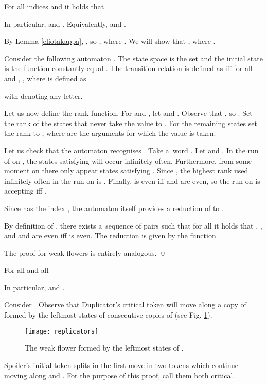 \documentclass{LMCS}
\begin{document}
\begin{lem} \label{flowers}
For all indices  and  it holds that 

In particular,  and . Equivalently,   and  .
\end{lem}

\proof By Lemma \ref{eliotakappa}, , so  , where . We will show that , where .

Consider the following automaton . The state space is the set  and the initial state is the function constantly equal . The transition relation  is defined as  iff for all  and ,  , where  is defined as 

with  denoting any letter.

Let us now define the rank function. For  and  , let  and . Observe that , so . Set the rank of the states that never take the value  to . For the remaining states set the rank to , where   are the arguments for which the value  is taken.

Let us check that the automaton recognises . Take a~word . Let  and . In the run of  on , the states  satisfying  will occur infinitely often. Furthermore, from some moment on there only appear states  satisfying . Since , the highest rank used infinitely often in the run on  is . Finally,  is even iff  and  are even, so the run on  is accepting iff .

Since  has the index , the automaton itself provides a reduction of  to . 

By definition of , there exists a~sequence of pairs  such that for all  it holds that , , and  and  are even iff  is even. The reduction is given by the function  

The proof for weak flowers is entirely analogous. \qed

\begin{lem}\label{replicators} 
For all  and all 

In particular,  and .
\end{lem}

\proof Consider . Observe that Duplicator's critical token will move along a copy of  formed by the leftmost states of consecutive copies of  (see Fig. \ref{fig:replicators}). 
\begin{figure}
\centering
\texttt{[image: replicators]}
\caption{The weak flower  formed by the leftmost states of .}
\label{fig:replicators}
\end{figure}
Spoiler's initial token splits in the first move in two tokens which continue moving along  and . For the purpose of this proof, call them both critical. 
\end{document}
